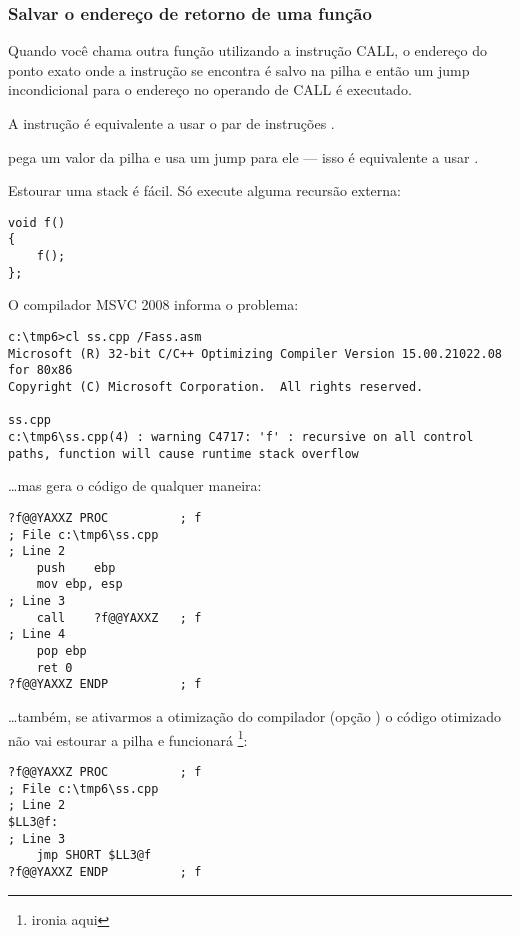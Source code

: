\subsubsection{Salvar o endereço de retorno de uma função}


Quando você chama outra função utilizando a instrução CALL, o endereço do ponto exato onde a 
instrução \CALL se encontra é salvo na pilha e então um jump incondicional para o endereço no operando de CALL é executado.

A instrução \CALL é equivalente a usar o par de instruções .

\RET pega um valor da pilha e usa um jump para ele --- isso é equivalente a usar .

\myindex{\Recursion}
Estourar uma stack é fácil. Só execute alguma recursão externa:

\begin{lstlisting}[style=customc]
void f()
{
	f();
};
\end{lstlisting}

O compilador MSVC 2008 informa o problema:

\begin{lstlisting}
c:\tmp6>cl ss.cpp /Fass.asm
Microsoft (R) 32-bit C/C++ Optimizing Compiler Version 15.00.21022.08 for 80x86
Copyright (C) Microsoft Corporation.  All rights reserved.

ss.cpp
c:\tmp6\ss.cpp(4) : warning C4717: 'f' : recursive on all control paths, function will cause runtime stack overflow
\end{lstlisting}

\dots mas gera o código de qualquer maneira:

\begin{lstlisting}[style=customasm]
?f@@YAXXZ PROC			; f
; File c:\tmp6\ss.cpp
; Line 2
	push	ebp
	mov	ebp, esp
; Line 3
	call	?f@@YAXXZ	; f
; Line 4
	pop	ebp
	ret	0
?f@@YAXXZ ENDP			; f
\end{lstlisting}

\dots também, se ativarmos a otimização do compilador (opção ) 
o código otimizado não vai estourar a pilha e funcionará  \footnote{ironia aqui}:

\begin{lstlisting}[style=customasm]
?f@@YAXXZ PROC			; f
; File c:\tmp6\ss.cpp
; Line 2
$LL3@f:
; Line 3
	jmp	SHORT $LL3@f
?f@@YAXXZ ENDP			; f
\end{lstlisting}

\PTBRph{}

